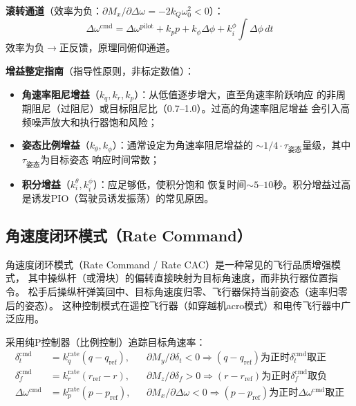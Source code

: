 \documentclass[a4paper,12pt]{ctexart}
\theoremstyle{plain}
\theoremstyle{definition}
\begin{document}
\textbf{滚转通道}（效率为负：$\partial M_x / \partial \Delta\omega = -2k_Q \omega_0^2 < 0$）：
\begin{equation}
    \Delta\omega^{\text{cmd}} = \Delta\omega^{\text{pilot}}
    + k_p p + k_\phi \Delta\phi
    + k_i^\phi \int \Delta\phi \, dt
    \label{eq:sas_roll}
\end{equation}
效率为负$\to$正反馈，原理同俯仰通道。

\textbf{增益整定指南}（指导性原则，非标定数值）：
\begin{itemize}
    \item \textbf{角速率阻尼增益}（$k_q, k_r, k_p$）：从低值逐步增大，直至角速率阶跃响应
          的非周期阻尼（过阻尼）或目标阻尼比（0.7--1.0）。过高的角速率阻尼增益
          会引入高频噪声放大和执行器饱和风险；
    \item \textbf{姿态比例增益}（$k_\theta, k_\phi$）：通常设定为角速率阻尼增益的
          $\sim 1/4 \cdot \tau_{\text{姿态}}$量级，其中$\tau_{\text{姿态}}$为目标姿态
          响应时间常数；
    \item \textbf{积分增益}（$k_i^\theta, k_i^\phi$）：应足够低，使积分饱和
          恢复时间$\sim 5$--$10$秒。积分增益过高是诱发PIO（驾驶员诱发振荡）的常见原因。
\end{itemize}

\subsection{角速度闭环模式（Rate Command）}

角速度闭环模式（Rate Command / Rate CAC）是一种常见的飞行品质增强模式，
其中操纵杆（或滑块）的偏转直接映射为目标角速度，而非执行器位置指令。
松手后操纵杆弹簧回中、目标角速度归零、飞行器保持当前姿态（速率归零后的姿态）。
这种控制模式在遥控飞行器（如穿越机acro模式）和电传飞行器中广泛应用。

采用纯P控制器（比例控制）追踪目标角速率：
\begin{align}
    \delta_t^{\text{cmd}} &= k_q^{\text{rate}} (q - q_{\text{ref}}),
    &&\partial M_y / \partial \delta_t < 0 \Rightarrow (q - q_{\text{ref}})
    \text{为正时} \delta_t^{\text{cmd}} \text{取正} \\
    \delta_f^{\text{cmd}} &= k_r^{\text{rate}} (r_{\text{ref}} - r),
    &&\partial M_z / \partial \delta_f > 0 \Rightarrow (r - r_{\text{ref}})
    \text{为正时} \delta_f^{\text{cmd}} \text{取负} \\
    \Delta\omega^{\text{cmd}} &= k_p^{\text{rate}} (p - p_{\text{ref}}),
    &&\partial M_x / \partial \Delta\omega < 0 \Rightarrow (p - p_{\text{ref}})
    \text{为正时} \Delta\omega^{\text{cmd}} \text{取正}
    \label{eq:rate_command}
\end{align}
\end{document}
